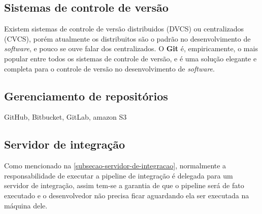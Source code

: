 


\subsection{Sistemas de controle de versão}
Existem sistemas de controle de versão distribuidos (DVCS) ou centralizados (CVCS), porém atualmente os distribuitos são o padrão no desenvolvimento de \emph{software}, e pouco se ouve falar dos centralizados. O \textbf{Git} é, empiricamente, o mais popular entre todos os sistemas de controle de versão, e é uma solução elegante e completa para o controle de versão no desenvolvimento de \emph{software}.

\subsection{Gerenciamento de repositórios}
GitHub, Bitbucket, GitLab, amazon S3

\subsection{Servidor de integração}
Como mencionado na \autoref{subsecao-servidor-de-integracao}, normalmente a responsabilidade de executar a pipeline de integração é delegada para um servidor de integração, assim tem-se a garantia de que o pipeline será de fato executado e o desenvolvedor não precisa ficar aguardando ela ser executada na máquina dele.

